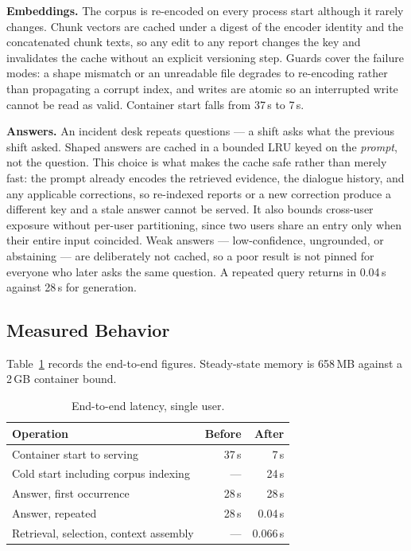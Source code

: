 \documentclass[12pt, a4paper]{article}
\begin{document}
\textbf{Embeddings.} The corpus is re-encoded on every process start although it rarely changes. Chunk vectors are cached under a digest of the encoder identity and the concatenated chunk texts, so any edit to any report changes the key and invalidates the cache without an explicit versioning step. Guards cover the failure modes: a shape mismatch or an unreadable file degrades to re-encoding rather than propagating a corrupt index, and writes are atomic so an interrupted write cannot be read as valid. Container start falls from 37\,s to 7\,s.

\textbf{Answers.} An incident desk repeats questions --- a shift asks what the previous shift asked. Shaped answers are cached in a bounded LRU keyed on the \emph{prompt}, not the question. This choice is what makes the cache safe rather than merely fast: the prompt already encodes the retrieved evidence, the dialogue history, and any applicable corrections, so re-indexed reports or a new correction produce a different key and a stale answer cannot be served. It also bounds cross-user exposure without per-user partitioning, since two users share an entry only when their entire input coincided. Weak answers --- low-confidence, ungrounded, or abstaining --- are deliberately not cached, so a poor result is not pinned for everyone who later asks the same question. A repeated query returns in 0.04\,s against 28\,s for generation.

\subsection{Measured Behavior}

Table~\ref{tab:efficiency} records the end-to-end figures. Steady-state memory is 658\,MB against a 2\,GB container bound.

\begin{table}[H]
\centering
\caption{End-to-end latency, single user.}
\label{tab:efficiency}
\begin{tabular}{lrr}
\toprule
\textbf{Operation} & \textbf{Before} & \textbf{After} \\
\midrule
Container start to serving & 37\,s & 7\,s \\
Cold start including corpus indexing & --- & 24\,s \\
Answer, first occurrence & 28\,s & 28\,s \\
Answer, repeated & 28\,s & 0.04\,s \\
Retrieval, selection, context assembly & --- & 0.066\,s \\
\bottomrule
\end{tabular}
\end{table}
\end{document}
